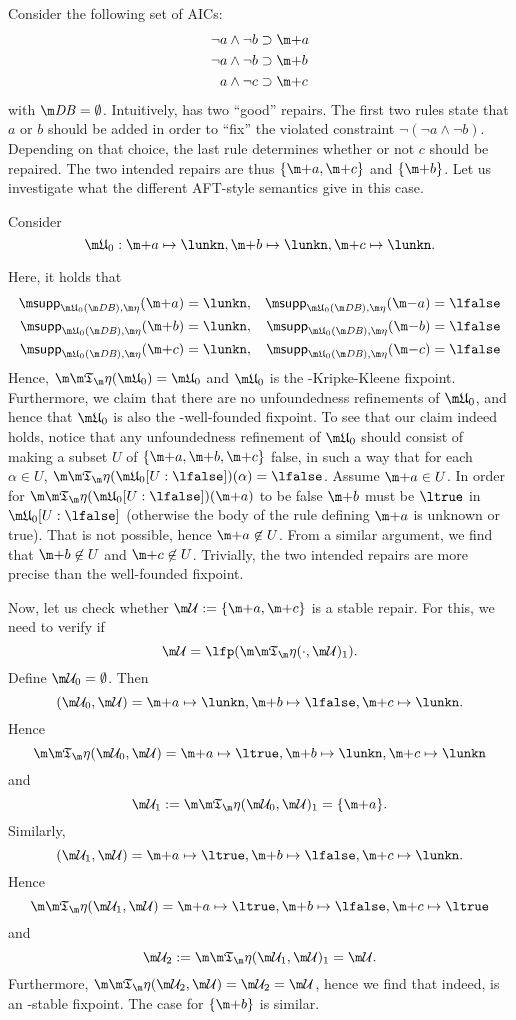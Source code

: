 \begin{example}
 Consider the following set \aics of AICs:
\begin{align*}
 \lnot a \land \lnot b&\aicrule \add a \\
 \lnot a \land \lnot b&\aicrule \add b\\
 a \land \lnot c &\aicrule \add c 
 \end{align*} with $\db = \emptyset$.
%  
 Intuitively, \aics has two ``good'' repairs. The first two rules state that $a$ or $b$ should be added in order to ``fix'' the violated constraint $\lnot (\lnot a \land \lnot b)$. 
 Depending on that choice, the last rule determines whether or not $c$ should be repaired.  The two intended repairs are thus $\{\add a,\add c\}$ and $\{\add b\}$. 
 Let us investigate what the different AFT-style semantics give in this case. 
 
 Consider 
\[\UUU_0: \add a\mapsto \lunkn,  \add b\mapsto \lunkn,\add c\mapsto\lunkn.\]

Here, it holds that 
\begin{align*}
 \supp_{\UUU_0(\db),\aics}(\add a) &= \lunkn, & \supp_{\UUU_0(\db),\aics}(\remove a) &=\lfalse \\
 \supp_{\UUU_0(\db),\aics}(\add b) &= \lunkn, & \supp_{\UUU_0(\db),\aics}(\remove b) &=\lfalse \\
 \supp_{\UUU_0(\db),\aics}(\add c) &= \lunkn, & \supp_{\UUU_0(\db),\aics}(\remove c) &=\lfalse 
\end{align*}
Hence, $\Ap(\UUU_0) = \UUU_0$ and $\UUU_0$ is the \Ap-Kripke-Kleene fixpoint. 
Furthermore, we claim that there are no unfoundedness refinements of $\UUU_0$, and hence that $\UUU_0$ is also the \Ap-well-founded fixpoint. To see that our claim indeed holds, notice that any unfoundedness refinement of $\UUU_0$ should consist of making a subset $U$ of $\{ \add a,\add b,\add c\}$ false, in such a way that for each $\alpha \in U$, $\Ap(\UUU_0[U: \lfalse])(\alpha)=\lfalse$. 
Assume $\add a\in U$. In order for $\Ap(\UUU_0[U: \lfalse])(\add a)$ to be false $\add b$ must be $\ltrue$ in $\UUU_0[U: \lfalse]$ (otherwise the body of the rule defining $\add a$ is unknown or true). That is not possible, hence $ \add a\not \in U$. From a similar argument, we find that $\add b\not \in U$ and $\add c\not \in U$. 
Trivially, the two intended repairs are more precise than the well-founded fixpoint. 

Now, let us check whether $\UU := \{\add a, \add c\}$ is a stable repair. 
For this, we need to verify if 
\[\UU =\lfp(\Ap(\cdot,\UU)_1).\]
Define $\UU_0=\emptyset$. Then 
\[(\UU_0,\UU) = \add a \mapsto \lunkn, \add b\mapsto \lfalse, \add c\mapsto \lunkn.\]
Hence 
\[\Ap(\UU_0,\UU) = \add a \mapsto \ltrue, \add b\mapsto \lunkn, \add c \mapsto \lunkn\]
and 
\[\UU_1 := \Ap(\UU_0,\UU)_1 = \{\add a\}.\]
Similarly, 
\[(\UU_1,\UU) = \add a \mapsto \ltrue, \add b\mapsto \lfalse,\add  c\mapsto \lunkn.\]
Hence 
\[\Ap(\UU_1,\UU) = \add a \mapsto \ltrue, \add b\mapsto \lfalse, \add c \mapsto \ltrue\]
and 
\[\UU_2 := \Ap(\UU_1,\UU)_1 = \UU.\]
Furthermore, $\Ap(\UU_2,\UU) = \UU_2=\UU$, hence  we find that indeed, \UU is an \Ap-stable fixpoint. 
The case for $\{\add b\}$ is similar. 


\end{example}
